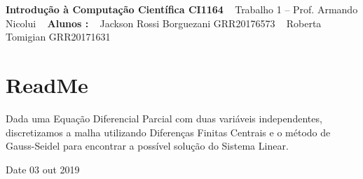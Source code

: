 {\bfseries Introdução à Computação Científica C\+I1164} ~\newline
 Trabalho 1 -- Prof. Armando Nicolui ~\newline
 {\bfseries Alunos \+:} ~\newline
 Jackson Rossi Borguezani G\+R\+R20176573 ~\newline
 Roberta Tomigian G\+R\+R20171631\hypertarget{index_introSec}{}\section{Read\+Me}\label{index_introSec}
Dada uma Equação Diferencial Parcial com duas variáveis independentes, discretizamos a malha utilizando Diferenças Finitas Centrais e o método de Gauss-\/\+Seidel para encontrar a possível solução do Sistema Linear.

\begin{DoxyDate}{Date}
03 out 2019 
\end{DoxyDate}
